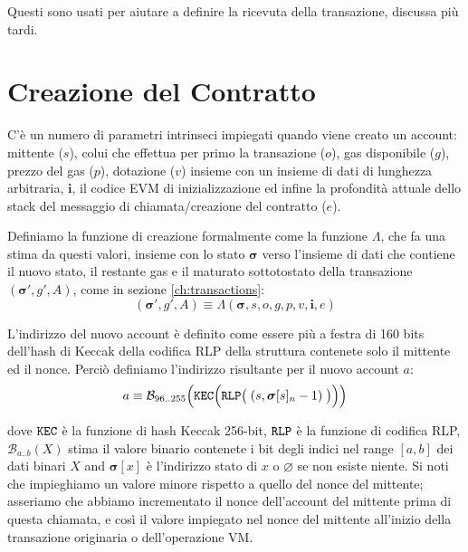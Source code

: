 \documentclass[9pt,oneside]{amsart}
\begin{document}
\begin{multicols}{2}
Questi sono usati per aiutare a definire la ricevuta della transazione, discussa più tardi.


\section{Creazione del Contratto} \label{ch:create}

C'è un numero di parametri intrinseci impiegati quando viene creato un account: mittente ($s$), colui che effettua per primo la transazione ($o$), gas disponibile ($g$), prezzo del gas ($p$), dotazione ($v$) insieme con un insieme di dati di lunghezza arbitraria, $\mathbf{i}$, il codice EVM di inizializzazione ed infine la profondità attuale dello stack del messaggio di chiamata/creazione del contratto ($e$).

Definiamo la funzione di creazione formalmente come la funzione $\Lambda$, che fa una stima da questi valori, insieme con lo stato $\boldsymbol{\sigma}$ verso l'insieme di dati che contiene il nuovo stato, il restante gas e il maturato sottotostato della transazione $(\boldsymbol{\sigma}', g', A)$, come in sezione \ref{ch:transactions}:
\begin{equation}
(\boldsymbol{\sigma}', g', A) \equiv \Lambda(\boldsymbol{\sigma}, s, o, g, p, v, \mathbf{i}, e)
\end{equation}

L'indirizzo del nuovo account è definito come essere più a festra di 160 bits dell'hash di Keccak della codifica RLP della struttura contenete solo il mittente ed il nonce. Perciò definiamo l'indirizzo risultante per il nuovo account $a$:
\begin{equation}
a \equiv \mathcal{B}_{96..255}\Big(\mathtt{\tiny KEC}\Big(\mathtt{\tiny RLP}\big(\;(s, \boldsymbol{\sigma}[s]_n - 1)\;\big)\Big)\Big)
\end{equation}

dove $\mathtt{\tiny KEC}$ è la funzione di hash Keccak 256-bit, $\mathtt{\tiny RLP}$ è la funzione di codifica RLP, $\mathcal{B}_{a..b}(X)$ stima il valore binario contenete i bit degli indici nel range $[a, b]$ dei dati binari $X$ and $\boldsymbol{\sigma}[x]$ è l'indirizzo stato di $x$ o $\varnothing$ se non esiste niente. Si noti che impieghiamo un valore minore rispetto a quello del nonce del mittente; asseriamo che abbiamo incrementato il nonce dell'account del mittente prima di questa chiamata, e così il valore impiegato nel nonce del mittente all'inizio della transazione originaria o dell'operazione VM.


\end{multicols}
\end{document}
